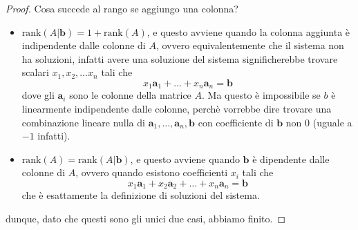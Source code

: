 \documentclass[11pt]{scrartcl}
\begin{document}
 	\begin{proof}
 		Cosa succede al rango se aggiungo una colonna?
 		\begin{itemize}
 			\item $\text{rank}(A|\mathbf{b})=1+\text{rank}(A)$, e questo avviene quando la colonna aggiunta è indipendente dalle colonne di $A$, ovvero equivalentemente che il sistema non ha soluzioni, infatti avere una soluzione del sistema significherebbe trovare scalari $x_1,x_2,\dots x_n$ tali che
 			$$x_1 \mathbf{a}_1+\dots+x_n \mathbf{a}_n=\mathbf{b}$$
 			dove gli $\mathbf{a}_i$ sono le colonne della matrice $A$. Ma questo è impossibile se $b$ è linearmente indipendente dalle colonne, perchè vorrebbe dire trovare una combinazione lineare nulla di $\mathbf{a}_1,\dots,\mathbf{a}_n,\mathbf{b}$ con coefficiente di $\mathbf{b}$ non $0$ (uguale a $-1$ infatti).
 			\item $\text{rank}(A)=\text{rank}(A|\mathbf{b})$, e questo avviene quando $\mathbf{b}$ è dipendente dalle colonne di $A$, ovvero quando esistono coefficienti $x_i$ tali che 
 			$$x_1\mathbf{a}_1+x_2\mathbf{a}_2+\dots + x_n\mathbf{a}_n=\mathbf{b}$$
 			che è esattamente la definizione di soluzioni del sistema.
 		\end{itemize}
 		dunque, dato che questi sono gli unici due casi, abbiamo finito.
 	\end{proof} 
 	
\end{document}
